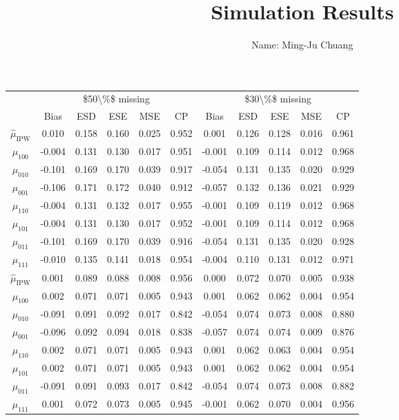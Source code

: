 \documentclass[
]{article}
\title{Simulation Results}
\author{Name: Ming-Ju Chuang}
\date{}
\begin{document}
\maketitle

\begin{table}[!h]
\centering
\begin{tabular}{ccccccccccc}
\toprule
\multicolumn{1}{c}{} & \multicolumn{5}{c}{\$50\textbackslash{}\%\$ missing} & \multicolumn{5}{c}{\$30\textbackslash{}\%\$ missing} \\
\cmidrule(l{3pt}r{3pt}){2-6} \cmidrule(l{3pt}r{3pt}){7-11}
 & Bias & ESD & ESE & MSE & CP & Bias & ESD & ESE & MSE & CP\\
\midrule
$\hat{\mu}_\text{IPW}$ & 0.010 & 0.158 & 0.160 & 0.025 & 0.952 & 0.001 & 0.126 & 0.128 & 0.016 & 0.961\\
$\hat{\mu}_{100}$ & -0.004 & 0.131 & 0.130 & 0.017 & 0.951 & -0.001 & 0.109 & 0.114 & 0.012 & 0.968\\
$\hat{\mu}_{010}$ & -0.101 & 0.169 & 0.170 & 0.039 & 0.917 & -0.054 & 0.131 & 0.135 & 0.020 & 0.929\\
$\hat{\mu}_{001}$ & -0.106 & 0.171 & 0.172 & 0.040 & 0.912 & -0.057 & 0.132 & 0.136 & 0.021 & 0.929\\
$\hat{\mu}_{110}$ & -0.004 & 0.131 & 0.132 & 0.017 & 0.955 & -0.001 & 0.109 & 0.119 & 0.012 & 0.968\\
$\hat{\mu}_{101}$ & -0.004 & 0.131 & 0.130 & 0.017 & 0.952 & -0.001 & 0.109 & 0.114 & 0.012 & 0.968\\
$\hat{\mu}_{011}$ & -0.101 & 0.169 & 0.170 & 0.039 & 0.916 & -0.054 & 0.131 & 0.135 & 0.020 & 0.928\\
$\hat{\mu}_{111}$ & -0.010 & 0.135 & 0.141 & 0.018 & 0.954 & -0.004 & 0.110 & 0.131 & 0.012 & 0.971\\
$\hat{\mu}_\text{IPW}$ & 0.001 & 0.089 & 0.088 & 0.008 & 0.956 & 0.000 & 0.072 & 0.070 & 0.005 & 0.938\\
$\hat{\mu}_{100}$ & 0.002 & 0.071 & 0.071 & 0.005 & 0.943 & 0.001 & 0.062 & 0.062 & 0.004 & 0.954\\
$\hat{\mu}_{010}$ & -0.091 & 0.091 & 0.092 & 0.017 & 0.842 & -0.054 & 0.074 & 0.073 & 0.008 & 0.880\\
$\hat{\mu}_{001}$ & -0.096 & 0.092 & 0.094 & 0.018 & 0.838 & -0.057 & 0.074 & 0.074 & 0.009 & 0.876\\
$\hat{\mu}_{110}$ & 0.002 & 0.071 & 0.071 & 0.005 & 0.943 & 0.001 & 0.062 & 0.063 & 0.004 & 0.954\\
$\hat{\mu}_{101}$ & 0.002 & 0.071 & 0.071 & 0.005 & 0.943 & 0.001 & 0.062 & 0.062 & 0.004 & 0.954\\
$\hat{\mu}_{011}$ & -0.091 & 0.091 & 0.093 & 0.017 & 0.842 & -0.054 & 0.074 & 0.073 & 0.008 & 0.882\\
$\hat{\mu}_{111}$ & 0.001 & 0.072 & 0.073 & 0.005 & 0.945 & -0.001 & 0.062 & 0.070 & 0.004 & 0.956\\
\bottomrule
\end{tabular}
\end{table}
\end{document}
